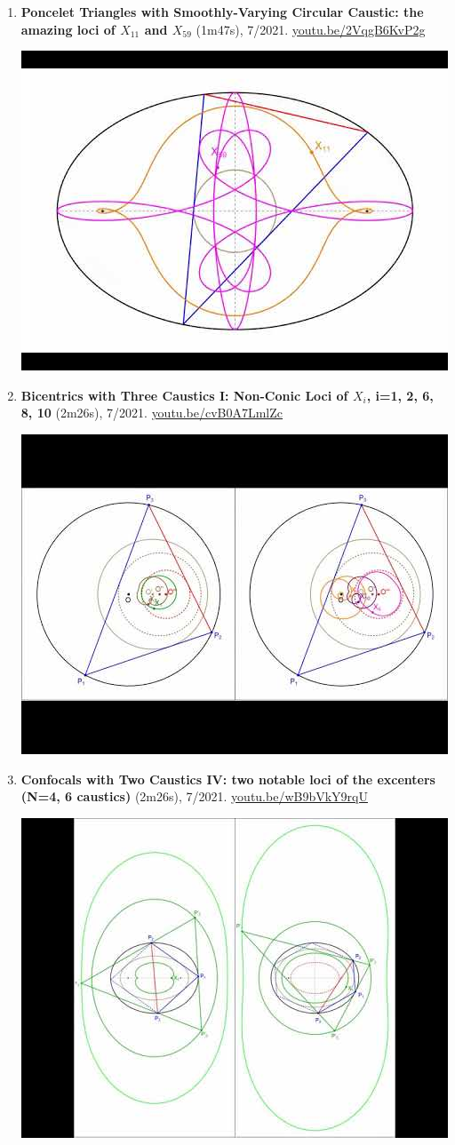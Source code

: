 \documentclass[12pt]{article}
\begin{document}
\begin{enumerate}[resume]
% 
\item \textbf{Poncelet Triangles with Smoothly-Varying Circular Caustic: the amazing loci of $X_{11}$ and $X_{59}$} (1m47s), 7/2021. \href{https://youtu.be/2VqgB6KvP2g}{\url{youtu.be/2VqgB6KvP2g}}
\begin{center}\includegraphics[width=.5\textwidth]{pics/2VqgB6KvP2g.jpg}\end{center}
% 
\item \textbf{Bicentrics with Three Caustics I: Non-Conic Loci of $X_i$, i=1, 2, 6, 8, 10} (2m26s), 7/2021. \href{https://youtu.be/cvB0A7LmlZc}{\url{youtu.be/cvB0A7LmlZc}}
\begin{center}\includegraphics[width=.5\textwidth]{pics/cvB0A7LmlZc.jpg}\end{center}
% 
\item \textbf{Confocals with Two Caustics IV: two notable loci of the excenters (N=4, 6 caustics)} (2m26s), 7/2021. \href{https://youtu.be/wB9bVkY9rqU}{\url{youtu.be/wB9bVkY9rqU}}
\begin{center}\includegraphics[width=.5\textwidth]{pics/wB9bVkY9rqU.jpg}\end{center}

\end{enumerate}
\end{document}
